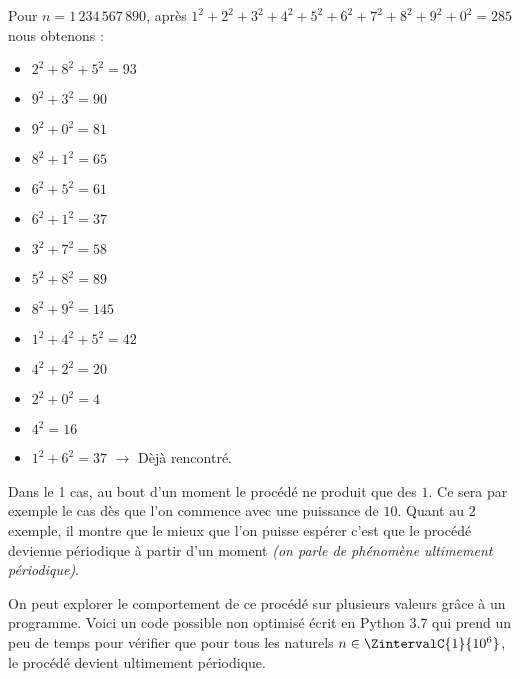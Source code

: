 \begin{example}
    Pour $n = 1\,234\,567\,890$, après $1^2 + 2^2 + 3^2 + 4^2 + 5^2 + 6^2 + 7^2 + 8^2 + 9^2 + 0^2 = 285$ nous obtenons :
    \vspace{-.7em}
    \begin{multicols}{2}
        \begin{itemize}[label=\textbullet]
            \item $2^2 + 8^2 + 5^2 = 93$
            \item $9^2 + 3^2 = 90$
            \item $9^2 + 0^2 = 81$
            \item $8^2 + 1^2 = 65$
            \item $6^2 + 5^2 = 61$
            \item $6^2 + 1^2 = 37$
            \item $3^2 + 7^2 = 58$
        \end{itemize}
        \columnbreak
        \begin{itemize}[label=\textbullet]
            \item $5^2 + 8^2 = 89$
            \item $8^2 + 9^2 = 145$
            \item $1^2 + 4^2 + 5^2 = 42$
            \item $4^2 + 2^2 = 20$
            \item $2^2 + 0^2 = 4$
            \item $4^2 = 16$
            \item $1^2 + 6^2 = 37$ $\rightarrow$ Dèjà rencontré.
        \end{itemize}
    \end{multicols}
\end{example}

Dans le 1\ier{} cas, au bout d'un moment le procédé ne produit que des $1$. Ce sera par exemple le cas dès que l'on commence avec une puissance de $10$.
Quant au 2\ieme{} exemple, il montre que le mieux que l'on puisse espérer c'est que le procédé devienne périodique à partir d'un moment \emph{(on parle de phénomène ultimement périodique)}.


\medskip

On peut explorer le comportement de ce procédé sur plusieurs valeurs grâce à un programme. Voici un code possible non optimisé écrit en Python 3.7 qui prend un peu de temps pour vérifier que pour tous les naturels $n \in \ZintervalC{1}{10^6}$, le procédé devient ultimement périodique.

